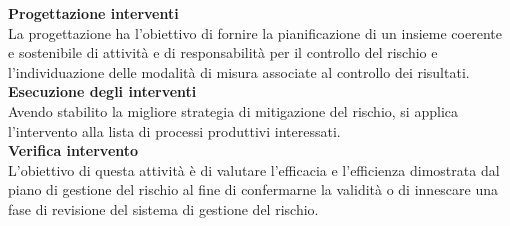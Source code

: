 \textbf{Progettazione interventi}\\
La progettazione ha l'obiettivo di fornire la pianificazione di un insieme coerente e
sostenibile di attività e di responsabilità per il controllo del rischio e l'individuazione
delle modalità di misura associate al controllo dei risultati.\\
\linebreak
\textbf{Esecuzione degli interventi}\\
Avendo stabilito la migliore strategia di mitigazione del rischio, si applica l'intervento
alla lista di processi produttivi interessati.\\
\linebreak
\textbf{Verifica intervento}\\
L'obiettivo di questa attività è di valutare l'efficacia e l'efficienza dimostrata dal piano di
gestione del rischio al fine di confermarne la validità o di innescare una fase di revisione
del sistema di gestione del rischio.


